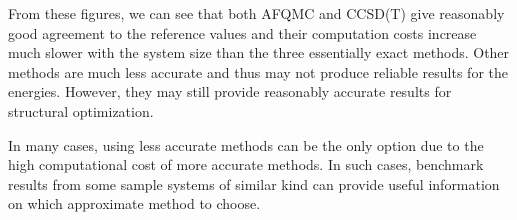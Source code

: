 From these figures, we can see that both AFQMC and CCSD(T) give reasonably good agreement to the reference values and their computation costs increase much slower with the system size than the three essentially exact methods.
Other methods are much less accurate and thus may not produce reliable results for the energies.
However, they may still provide reasonably accurate results for structural optimization.

In many cases, using less accurate methods can be the only option due to the high computational cost of more accurate methods.
In such cases, benchmark results from some sample systems of similar kind can provide useful information on which approximate method to choose.